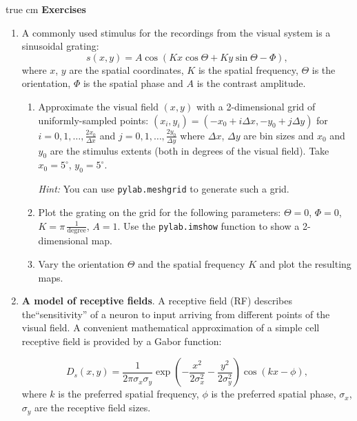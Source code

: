 \documentclass[12pt, a4]{article}
\begin{document}
 true cm
{\bf Exercises}
\begin{enumerate}

    \item  A commonly used stimulus for the recordings from the visual
        system is a sinusoidal grating:
        \begin{equation}
            s(x, y) = A \cos(Kx\cos\Theta + Ky\sin\Theta
            -\Phi),
            \label{eq:grating}
        \end{equation}
        where $x$, $y$ are the spatial coordinates, $K$ is the spatial
        frequency, $\Theta$ is the orientation,  $\Phi$ is the spatial
        phase and $A$ is the contrast amplitude.

        \begin{enumerate}
            \item Approximate the visual field $(x,y)$ with a
                2-dimensional grid of uniformly-sampled points:
                $(x_i, y_i)= (-x_0+i\Delta x, -y_0+j\Delta y)$ for
                $i=0,1,\dots, \frac{2x_0}{\Delta x}$ and $j=0,1,\dots,
                \frac{2y_0}{\Delta y}$ where $\Delta x$, $\Delta y$
                are bin sizes and $x_0$ and $y_0$ are the
                stimulus extents (both in degrees of the visual field). Take
                $x_0=5^\circ$, $y_0=5^\circ$.
                
                \textit{Hint:} You can use
                \texttt{pylab.meshgrid} to generate such a grid. 
            \item \label{ex:grating} Plot the grating on the
                grid for the following parameters: $\Theta=0$,
                $\Phi=0$, $K=\pi\,\frac{1}{\mathrm{degree}}$, $A=1$.  Use the 
                \texttt{pylab.imshow} function to show a 2-dimensional map. 
            \item \label{ex:varygrating}Vary the orientation $\Theta$ and the
                spatial frequency $K$ and plot the resulting maps.
        \end{enumerate}

    \item \textbf{A model of receptive fields}.  A receptive field (RF)
                describes the``sensitivity'' of a neuron to input arriving from
                different points of the visual field. A convenient mathematical
                approximation of a simple cell receptive field is provided by a
                Gabor function:

        \begin{equation}
           D_s(x,y)=\frac{1}{2\pi\sigma_x\sigma_y}
            \exp\left(-\frac{x^2}{2\sigma_x^2}-\frac
            {y^2}{ 2\sigma_y^2}\right)\cos(kx-\phi),
            \label{eq:Gabor}
        \end{equation}
        where  $k$ is the preferred spatial frequency, $\phi$ is
        the preferred spatial phase,  $\sigma_x$,
        $\sigma_y$ are the receptive field sizes.


\end{enumerate}
\end{document}
